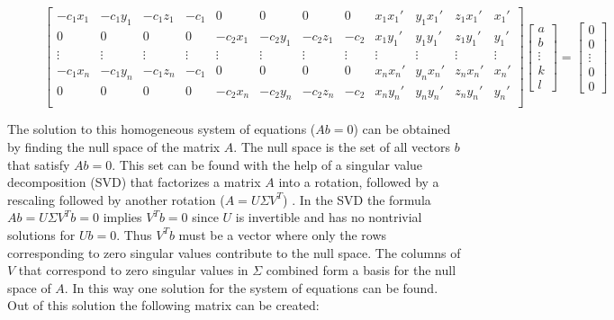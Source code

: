 \documentclass[conference]{IEEEtran}
\begin{document}
\begin{figure}[h]
    \begin{equation} \label{eqn:DLT}
        \begin{bmatrix}
            -c_1 x_1 & -c_1 y_1 & -c_1 z_1 & -c_1   & 0        & 0        & 0        & 0      & x_1 x_{1}' & y_1 x_{1}' & z_1 x_{1}' & x_{1}' \\
            0        & 0        & 0        & 0      & -c_2 x_1 & -c_2 y_1 & -c_2 z_1 & -c_2   & x_1 y_{1}' & y_1 y_{1}' & z_1 y_{1}' & y_{1}' \\
            \vdots   & \vdots   & \vdots   & \vdots & \vdots   & \vdots   & \vdots   & \vdots & \vdots     & \vdots     & \vdots     & \vdots \\
            -c_1 x_n & -c_1 y_n & -c_1 z_n & -c_1   & 0        & 0        & 0        & 0      & x_n x_{n}' & y_n x_{n}' & z_n x_{n}' & x_{n}' \\
            0        & 0        & 0        & 0      & -c_2 x_n & -c_2 y_n & -c_2 z_n & -c_2   & x_n y_{n}' & y_n y_{n}' & z_n y_{n}' & y_{n}' \\
        \end{bmatrix}
        \begin{bmatrix}
            a      \\
            b      \\
            \vdots \\
            k      \\
            l
        \end{bmatrix}
        =
        \begin{bmatrix}
            0      \\
            0      \\
            \vdots \\
            0      \\
            0
        \end{bmatrix}
    \end{equation}
\end{figure}

The solution to this homogeneous system of equations ($Ab = 0$) can be obtained by finding the null space of the matrix $A$. The null space is the set of all vectors $b$ that satisfy $Ab = 0$. This set can be found with the help of a  singular value decomposition (SVD) that factorizes a matrix $A$ into a rotation, followed by a rescaling followed by another rotation ($A = U\Sigma V^{T}$) \cite{SVD}. In the SVD the formula $Ab = U\Sigma V^{T}b = 0$ implies $V^{T}b = 0$ since $U$ is invertible and has no nontrivial solutions for $Ub = 0$. Thus $V^{T}b$ must be a vector where only the rows corresponding to zero singular values contribute to the null space. The columns of $V$ that correspond to zero singular values in $\Sigma$ combined form a basis for the null space of $A$. In this way one solution for the system of equations can be found. Out of this solution the following matrix can be created:
\end{document}
